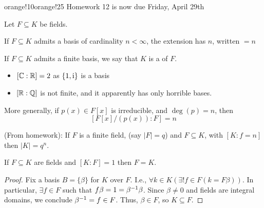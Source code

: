 \documentclass[notes.tex]{subfiles}
\begin{document}
\begin{classnote}{orange!10}{orange!25}
	Homework 12 is now due Friday, April 29th
\end{classnote}

Let $F\subseteq K$ be fields.

\begin{defn}
	If $F\subseteq K$ admits a basis of cardinality $n < \infty$, the extension has  $n$, written \kw{$[K:F]$}$=n$
\end{defn}

\begin{defn}
	If $F\subseteq K$ admits a finite basis, we say that $K$ is a  of $F$.
\end{defn}

\begin{eg}\leavevmode
	\begin{itemize}
		\item $[\mathbb{C}:\mathbb{R}] = 2$ as $\{1, \mathrm{i}\}$ is a basis
		\item $[\mathbb{R}:\mathbb{Q}]$ is not finite, and it apparently has only horrible bases.
	\end{itemize}
\end{eg}
More generally, if $p(x)\in F[x]$ is irreducible, and $\deg(p) =n$, then 
	\[
		\left[F[x]/(p(x)):F\right] = n
	\]

\begin{remark}
	(From homework): If $F$ is a finite field, (say $|F| = q$) and $F\subseteq K$, with $[K:f=n]$ then $|K| = q^n$.
\end{remark}

\begin{proposition}
	If $F\subseteq K$ are fields and $[K : F] = 1$ then $F = K$.
\end{proposition}
\begin{proof}
	Fix a basis $B = \{\beta\}$ for $K$ over $F$.
	I.e., $\forall k\in K(\exists! f\in F(k=F \beta))$.
	In particular, $\exists f\in F$ such that $f \beta = 1 = {\beta}^{-1} \beta$.
	Since $\beta\ne 0$ and fields are integral domains, we conclude ${\beta}^{-1} = f\in F$. Thus, $\beta\in F$, so $K\subseteq F$.
\end{proof}
\end{document}
